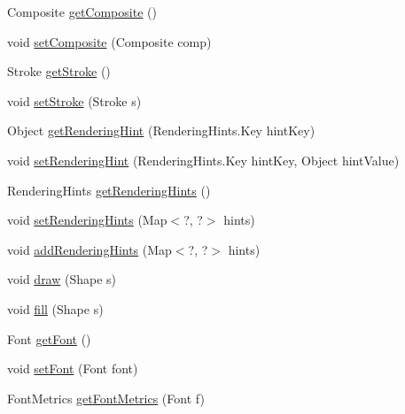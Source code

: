 \begin{DoxyCompactItemize}
\item 
Composite \mbox{\hyperlink{classorg_1_1jfree_1_1chart_1_1fx_1_1_f_x_graphics2_d_ad464b911fede89539635352d2f89e4d7}{get\+Composite}} ()
\item 
void \mbox{\hyperlink{classorg_1_1jfree_1_1chart_1_1fx_1_1_f_x_graphics2_d_acaccf830e2e26b3558ede1c13933365c}{set\+Composite}} (Composite comp)
\item 
Stroke \mbox{\hyperlink{classorg_1_1jfree_1_1chart_1_1fx_1_1_f_x_graphics2_d_ae202fc349856d0a7fea91cdeb8c4e988}{get\+Stroke}} ()
\item 
void \mbox{\hyperlink{classorg_1_1jfree_1_1chart_1_1fx_1_1_f_x_graphics2_d_ad92b82fa8bc1ea26d02986d9b0253506}{set\+Stroke}} (Stroke s)
\item 
Object \mbox{\hyperlink{classorg_1_1jfree_1_1chart_1_1fx_1_1_f_x_graphics2_d_afa793efe72f1ae21a3c9b9c10927ca31}{get\+Rendering\+Hint}} (Rendering\+Hints.\+Key hint\+Key)
\item 
void \mbox{\hyperlink{classorg_1_1jfree_1_1chart_1_1fx_1_1_f_x_graphics2_d_a727f4c6a3f846b60dd33bfd933e3c812}{set\+Rendering\+Hint}} (Rendering\+Hints.\+Key hint\+Key, Object hint\+Value)
\item 
Rendering\+Hints \mbox{\hyperlink{classorg_1_1jfree_1_1chart_1_1fx_1_1_f_x_graphics2_d_a55636a4088737a9c9d29655b315d8085}{get\+Rendering\+Hints}} ()
\item 
void \mbox{\hyperlink{classorg_1_1jfree_1_1chart_1_1fx_1_1_f_x_graphics2_d_aeb0a99279a4b73ea5e5a4eb298c645d3}{set\+Rendering\+Hints}} (Map$<$?, ?$>$ hints)
\item 
void \mbox{\hyperlink{classorg_1_1jfree_1_1chart_1_1fx_1_1_f_x_graphics2_d_a78e20693adc97f409ee822b9afa68b0e}{add\+Rendering\+Hints}} (Map$<$?, ?$>$ hints)
\item 
void \mbox{\hyperlink{classorg_1_1jfree_1_1chart_1_1fx_1_1_f_x_graphics2_d_a6884b9dbcfe6edf8918466c6f1232236}{draw}} (Shape s)
\item 
void \mbox{\hyperlink{classorg_1_1jfree_1_1chart_1_1fx_1_1_f_x_graphics2_d_a581937ef92ce8e2079135f1d03a1154c}{fill}} (Shape s)
\item 
Font \mbox{\hyperlink{classorg_1_1jfree_1_1chart_1_1fx_1_1_f_x_graphics2_d_ab188424f822b24ccc86d39740e4183e4}{get\+Font}} ()
\item 
void \mbox{\hyperlink{classorg_1_1jfree_1_1chart_1_1fx_1_1_f_x_graphics2_d_a20e1506df8646706b0b404e9a6b1423f}{set\+Font}} (Font font)
\item 
Font\+Metrics \mbox{\hyperlink{classorg_1_1jfree_1_1chart_1_1fx_1_1_f_x_graphics2_d_a59cf49af7fa02e82c05cb2f76d4ed0b5}{get\+Font\+Metrics}} (Font f)

\end{DoxyCompactItemize}
